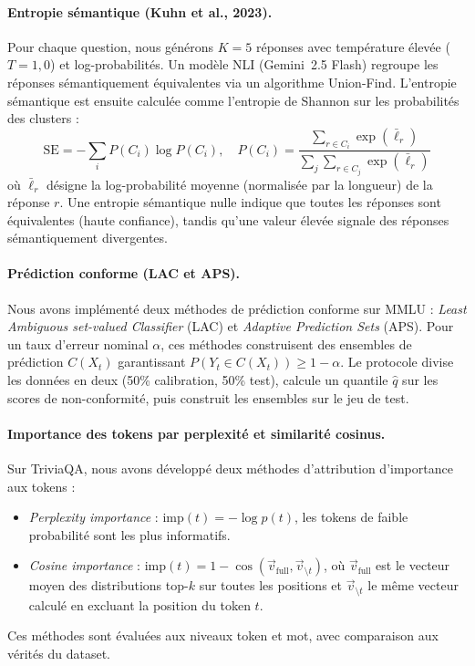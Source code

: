 \documentclass[a4paper, 11pt]{article}
\begin{document}
\paragraph{Entropie sémantique (Kuhn et al., 2023).}
Pour chaque question, nous générons $K=5$ réponses avec température élevée ($T=1{,}0$) et log-probabilités. Un modèle NLI (Gemini~2.5 Flash) regroupe les réponses sémantiquement équivalentes via un algorithme Union-Find. L'entropie sémantique est ensuite calculée comme l'entropie de Shannon sur les probabilités des clusters :
\begin{equation}
    \text{SE} = -\sum_{i} P(C_i) \log P(C_i), \quad P(C_i) = \frac{\sum_{r \in C_i} \exp(\bar{\ell}_r)}{\sum_{j} \sum_{r \in C_{j}} \exp(\bar{\ell}_r)}
\end{equation}
où $\bar{\ell}_r$ désigne la log-probabilité moyenne (normalisée par la longueur) de la réponse $r$. Une entropie sémantique nulle indique que toutes les réponses sont équivalentes (haute confiance), tandis qu'une valeur élevée signale des réponses sémantiquement divergentes.
\paragraph{Prédiction conforme (LAC et APS).}
Nous avons implémenté deux méthodes de prédiction conforme sur MMLU : \emph{Least Ambiguous set-valued Classifier} (LAC) et \emph{Adaptive Prediction Sets} (APS). Pour un taux d'erreur nominal $\alpha$, ces méthodes construisent des ensembles de prédiction $C(X_t)$ garantissant $P(Y_t \in C(X_t)) \geq 1-\alpha$. Le protocole divise les données en deux (50\% calibration, 50\% test), calcule un quantile $\hat{q}$ sur les scores de non-conformité, puis construit les ensembles sur le jeu de test.
\paragraph{Importance des tokens par perplexité et similarité cosinus.}
Sur TriviaQA, nous avons développé deux méthodes d'attribution d'importance aux tokens :
\begin{itemize}[nosep]
    \item \emph{Perplexity importance} : $\text{imp}(t) = -\log p(t)$, les tokens de faible probabilité sont les plus informatifs.
    \item \emph{Cosine importance} : $\text{imp}(t) = 1 - \cos(\vec{v}_{\text{full}}, \vec{v}_{\setminus t})$, où $\vec{v}_{\text{full}}$ est le vecteur moyen des distributions top-$k$ sur toutes les positions et $\vec{v}_{\setminus t}$ le même vecteur calculé en excluant la position du token $t$.
\end{itemize}
Ces méthodes sont évaluées aux niveaux token et mot, avec comparaison aux vérités du dataset.
\end{document}

